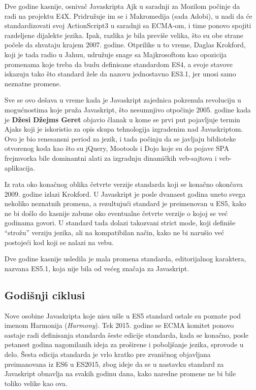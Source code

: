 Dve godine kasnije, osnivač Javaskripta Ajk u saradnji za Mozilom počinje da radi na projektu E4X.
Pridružuje im se i Makromedija (sada Adobi), u nadi da će standardizovati svoj ActionScript3 u saradnji sa ECMA-om, i time ponovo spojiti razdeljene dijalekte jezika.
Ipak, razlika je bila previše velika, što su obe strane počele da shvataju krajem 2007. godine.
Otprilike u to vreme, Daglas Krokford, koji je tada radio u Jahuu, udružuje snage sa Majkrosoftom kao opozicija promenama koje treba da budu definisane standardom ES4, a svoje stavove iskazuju tako što standard žele da nazovu jednostavno ES3.1, jer unosi samo neznatne promene.

Sve se ovo dešava u vreme kada je Javaskript zajednica pokrenula revoluciju u mogućnostima koje pruža Javaskript, što nesumnjivo otpočinje 2005. godine kada je \textbf{Džesi Džejms Geret} objavio članak u kome se prvi put pojavljuje termin Ajaks koji je iskoristio za opis skupa tehnologija izgradenim nad Javaskriptom.
Ovo je bio renesansni period za jezik, i tada počinju da se javljaju biblioteke otvorenog koda kao što su jQuery, Mootools i Dojo koje su do pojave SPA frejmvorka bile dominantni alati za izgradnju dinamičkih veb-sajtova i veb-aplikacija.

Iz rata oko konačnog oblika četvrte verzije standarda koji se konačno okončava 2009. godine izlazi Krokford.
U Javaskript je posle dvanaest godina uneto svega nekoliko neznatnih promena, a rezultujući standard je preimenovan u ES5, kako ne bi došlo do kasnije zabune oko eventualne četvrte verzije o kojoj se već godinama govori.
U standard tada dolazi takozvani strict mode, koji definiše “strožu” verziju jezika, ali na kompatibilan način, kako ne bi narušio već postojeći kod koji se nalazi na vebu.

Dve godine kasnije usledila je mala promena standarda, editorijalnog karaktera, nazvana ES5.1, koja nije bila od većeg značaja za Javaskript.

\subsection{Godišnji ciklusi}

Nove osobine Javaskripta koje nisu ušle u ES5 standard ostale su poznate pod imenom Harmonija (\textsl{Harmony}).
Tek 2015. godine se ECMA komitet ponovo sastaje radi definisanja standarda šeste edicije standarda, kada se konačno, posle petanest godina nagomilanih ideja za proširene i poboljšanje jezika, sprovode u delo.
Šesta edicija standarda je vrlo kratko pre zvaničnog objavljana preimanovana iz ES6 u ES2015, zbog ideje da se u nastavku standard za Javaskript obnavlja na svakih godinu dana, kako naredne promene ne bi bile toliko velike kao ova.

